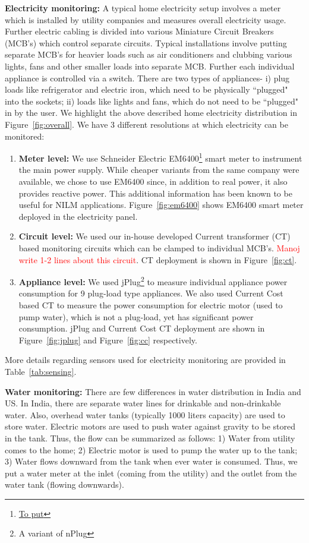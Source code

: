 \documentclass[10pt]{sensys-proc}
\newcommand{\redcolor}[1]{\textcolor{red}{#1}}
\newcommand{\figref}[1]{Figure~\ref{#1}}
\newcommand{\tabref}[1]{Table~\ref{#1}}
\begin{document}
\noindent\textbf{Electricity monitoring:} A typical home electricity setup involves a meter which is installed by utility companies and measures overall electricity usage. Further electric cabling is divided into various Miniature Circuit Breakers (MCB's) which control separate circuits. Typical installations involve putting separate MCB's for heavier loads such as air conditioners and clubbing various lights, fans and other smaller loads into separate MCB. Further each individual appliance is controlled via a switch. There are two types of appliances- i) plug loads like refrigerator and electric iron, which need to be physically ``plugged" into the sockets; ii) loads like lights and fans, which do not need to be ``plugged" in by the user. We highlight the above described home electricity distribution in \figref{fig:overall}. We have 3 different resolutions at which electricity can be monitored:
\begin{enumerate}
\item \textbf{Meter level:} We use Schneider Electric EM6400\footnote{\url{To put}} smart meter to instrument the main power supply. While cheaper variants from the same company were available, we chose to use EM6400 since, in addition to real power, it also provides reactive power. This additional information has been known to be useful for NILM applications\cite{hart}. \figref{fig:em6400} shows EM6400 smart meter deployed in the electricity panel.

\item \textbf{Circuit level:} We used our in-house developed Current transformer (CT) based monitoring circuits which can be clamped to individual MCB's. \redcolor{Manoj write 1-2 lines about this circuit}. CT deployment is shown in \figref{fig:ct}.

\item \textbf{Appliance level:} We used jPlug\footnote{A variant of nPlug\cite{nplug}} to measure individual appliance power consumption for 9 plug-load type appliances. We also used Current Cost based CT to measure the power consumption for electric motor (used to pump water), which is not a plug-load, yet has significant power consumption. jPlug and Current Cost CT deployment are shown in \figref{fig:jplug} and \figref{fig:cc} respectively.
\end{enumerate}
More details regarding sensors used for electricity monitoring are provided in \tabref{tab:sensing}.

\noindent \textbf{Water monitoring:} There are few differences in water distribution in India and US. In India, there are separate water lines for drinkable and non-drinkable water. Also, overhead water tanks (typically 1000 liters capacity) are used to store water. Electric motors are used to push water against gravity to be stored in the tank. Thus, the flow can be summarized as follows: 1) Water from utility comes to the home; 2) Electric motor is used to pump the water up to the tank; 3) Water flows downward from the tank when ever water is consumed. Thus, we put a water meter at the inlet (coming from the utility) and the outlet from the water tank (flowing downwards). 
\end{document}
